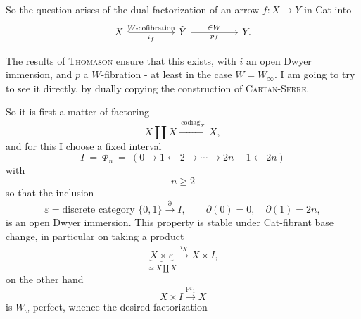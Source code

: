 \documentclass[11pt]{article}
\newcommand{\printedpage}[1]{\marginpar{\footnotesize p.~#1}}
\newcommand{\msp}[1]{\marginpar{\footnotesize [#1]}}
\begin{document}
\printedpage{145}

\msp{page 228}
So the question arises of the dual factorization of an arrow $f : X \longrightarrow Y$ in Cat into
\[
\begin{tikzcd}[column sep=huge]
X \arrow[r, hook, "W\text{-cofibration}", "i_f"'] & \tilde{Y} \arrow[r, "\in W", "p_f"'] & Y.
\end{tikzcd}
\]

The results of \textsc{Thomason} ensure that this exists, with $i$ an open Dwyer immersion, and $p$ a $W$-fibration - at least in the case $W = W_\infty$. I am going to try to see it directly, by dually copying the construction of \textsc{Cartan-Serre}.

So it is first a matter of factoring
\[
X \amalg X \xrightarrow{\ \mathrm{codiag}_X\ } X,
\]
and for this I choose a fixed interval
\[
I \ = \ \Phi_n \ = \ (0 \longrightarrow 1 \longleftarrow 2 \longrightarrow \cdots \longrightarrow 2n-1 \longleftarrow 2n)
\]
with
\[
n \geq 2
\]
so that the inclusion
\[
\varepsilon = \text{discrete category } \{0,1\} \xrightarrow{\partial} I, \qquad \partial(0) = 0, \quad \partial(1) = 2n,
\]
is an open Dwyer immersion. This property is stable under Cat-fibrant base change, in particular on taking a product
\[
\underbrace{X \times \varepsilon}_{\simeq X \coprod X} \xrightarrow{i_X} X \times I,
\]
\begingroup\renewcommand{\thefootnote}{}\endgroup
\printedpage{146}
\msp{page 229}
on the other hand
\[
X \times I \xrightarrow{\mathrm{pr}_1} X
\]
is $W_\omega$-perfect, whence the desired factorization %
\end{document}
